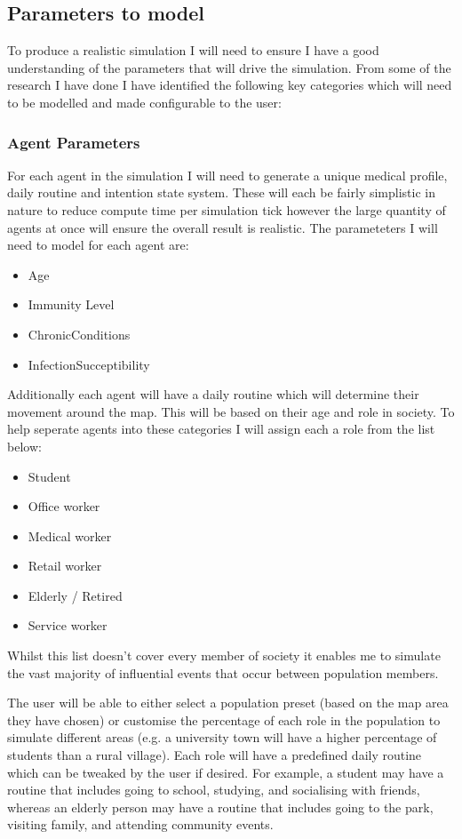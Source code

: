 \subsection{Parameters to model}
To produce a realistic simulation I will need to ensure I have a good understanding of the parameters that will drive the simulation. From some of the research I have done I have identified the following key categories which will need to be modelled and made configurable to the user:
\subsubsection*{Agent Parameters}
For each agent in the simulation I will need to generate a unique medical profile, daily routine and intention state system. These will each be fairly simplistic in nature to reduce compute time per simulation tick however the large quantity of agents at once will ensure the overall result is realistic. The parameteters I will need to model for each agent are:
\begin{itemize}
    \item Age
    \item Immunity Level
    \item ChronicConditions
    \item InfectionSucceptibility
\end{itemize}
Additionally each agent will have a daily routine which will determine their movement around the map. This will be based on their age and role in society. To help seperate agents into these categories I will assign each a role from the list below:
\begin{itemize}
    \item Student
    \item Office worker
    \item Medical worker
    \item Retail worker
    \item Elderly / Retired
    \item Service worker
\end{itemize}

Whilst this list doesn't cover every member of society it enables me to simulate the vast majority of influential events that occur between population members.

The user will be able to either select a population preset (based on the map area they have chosen) or customise the percentage of each role in the population to simulate different areas (e.g. a university town will have a higher percentage of students than a rural village). Each role will have a predefined daily routine which can be tweaked by the user if desired. For example, a student may have a routine that includes going to school, studying, and socialising with friends, whereas an elderly person may have a routine that includes going to the park, visiting family, and attending community events.

